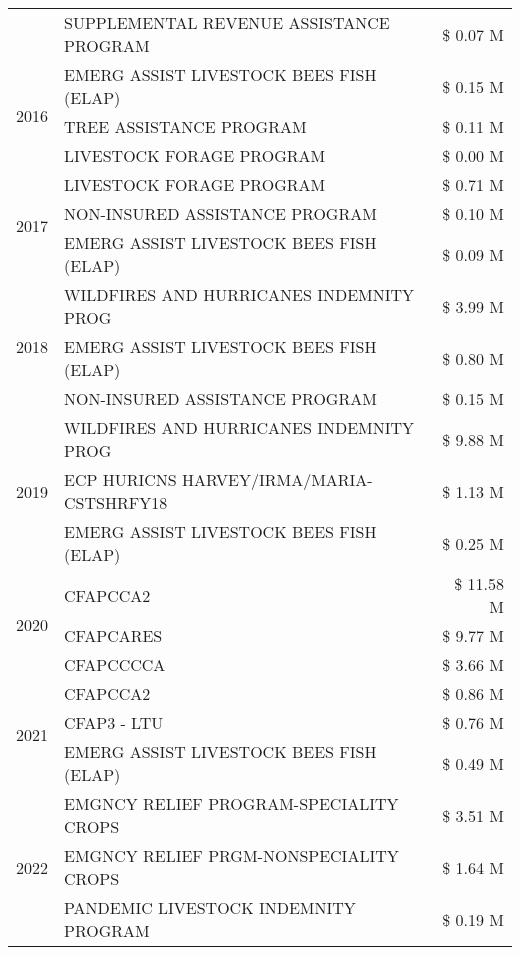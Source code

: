 \begin{tabular}{llr}
 & SUPPLEMENTAL REVENUE ASSISTANCE PROGRAM & \$ 0.07 M \\
\cline{1-3}
\multirow[t]{3}{*}{2016} & EMERG ASSIST LIVESTOCK BEES FISH (ELAP) & \$ 0.15 M \\
 & TREE ASSISTANCE PROGRAM & \$ 0.11 M \\
 & LIVESTOCK FORAGE PROGRAM & \$ 0.00 M \\
\cline{1-3}
\multirow[t]{3}{*}{2017} & LIVESTOCK FORAGE PROGRAM & \$ 0.71 M \\
 & NON-INSURED ASSISTANCE PROGRAM & \$ 0.10 M \\
 & EMERG ASSIST LIVESTOCK BEES FISH (ELAP) & \$ 0.09 M \\
\cline{1-3}
\multirow[t]{3}{*}{2018} & WILDFIRES AND HURRICANES INDEMNITY PROG & \$ 3.99 M \\
 & EMERG ASSIST LIVESTOCK BEES FISH (ELAP) & \$ 0.80 M \\
 & NON-INSURED ASSISTANCE PROGRAM & \$ 0.15 M \\
\cline{1-3}
\multirow[t]{3}{*}{2019} & WILDFIRES AND HURRICANES INDEMNITY PROG & \$ 9.88 M \\
 & ECP HURICNS HARVEY/IRMA/MARIA-CSTSHRFY18 & \$ 1.13 M \\
 & EMERG ASSIST LIVESTOCK BEES FISH (ELAP) & \$ 0.25 M \\
\cline{1-3}
\multirow[t]{3}{*}{2020} & CFAPCCA2 & \$ 11.58 M \\
 & CFAPCARES & \$ 9.77 M \\
 & CFAPCCCCA & \$ 3.66 M \\
\cline{1-3}
\multirow[t]{3}{*}{2021} & CFAPCCA2 & \$ 0.86 M \\
 & CFAP3 - LTU & \$ 0.76 M \\
 & EMERG ASSIST LIVESTOCK BEES FISH (ELAP) & \$ 0.49 M \\
\cline{1-3}
\multirow[t]{3}{*}{2022} & EMGNCY RELIEF PROGRAM-SPECIALITY CROPS & \$ 3.51 M \\
 & EMGNCY RELIEF PRGM-NONSPECIALITY CROPS & \$ 1.64 M \\
 & PANDEMIC LIVESTOCK INDEMNITY PROGRAM & \$ 0.19 M \\
\cline{1-3}
\bottomrule
\end{tabular}
